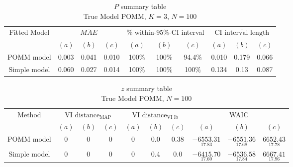 \documentclass[11pt]{amsart}
\begin{document}
\begin{table}[htbp]
\centering
\caption*{
{\large $P$ summary table} \\ 
{\small True Model POMM, $K=3$, $N=100$}
} 
\begin{tabular}{cccccccccc}
\toprule
\multirow{2}{*}{Fitted Model} & \multicolumn{3}{c}{
$\overline{MAE}$ } & \multicolumn{3}{c}{
$\%$ within-95\%-CI interval} & \multicolumn{3}{c}{ $\overline{\text{CI interval length}}$} \\
\cmidrule(lr){2-4} \cmidrule(lr){5-7} \cmidrule(lr){8-10}
& $(a)$ & $(b)$ & $(c)$ & $(a)$ & $(b)$ & $(c)$ & $(a)$ & $(b)$ & $(c)$ \\
\midrule
POMM model  &0.003 & 0.041 & 0.010 & 100$\%$ & 100$\%$ & 94.4$\%$ & 0.010 & 0.179 & 0.066  \\
Simple model & 0.060 &  0.027 & 0.014 & 100$\%$ &100$\%$  & 100$\%$  & 0.134 & 0.13 & 0.087 \\
\bottomrule
\end{tabular}
\label{table:simulations_from_simple}
\end{table}


\begin{table}[htbp]
\centering
\caption*{
{\large $z$ summary table} \\ 
{\small True Model POMM, $N=100$}
} 
\begin{tabular}{cccccccccc}
\toprule
\multirow{2}{*}{Method} & \multicolumn{3}{c}{
VI $\text{distance}_{\text{MAP}}$} & \multicolumn{3}{c}{
VI $\text{distance}_{\text{VI lb}}$} & \multicolumn{3}{c}{WAIC} \\
\cmidrule(lr){2-4} \cmidrule(lr){5-7} \cmidrule(lr){8-10}
& $(a)$ & $(b)$ & $(c)$ & $(a)$ & $(b)$ & $(c)$ & $(a)$ & $(b)$ & $(c)$ \\
\midrule
POMM model  &0 & 0 & 0 & 0 & 0.0 & 0.38 & $\underset{17.83}{-6553.31}$ & $\underset{17.68}{-6551.36}$ & $\underset{17.78}{6652.43}$  \\
Simple model & 0 & 0 & 0 & 0 & 0.4 & 0.0  & $\underset{17.60}{-6415.70}$ & $\underset{17.84}{-6536.58}$ & $\underset{17.96}{6667.41}$ \\
\bottomrule
\end{tabular}
\label{table:simulations_from_simple}
\end{table}
\end{document}
